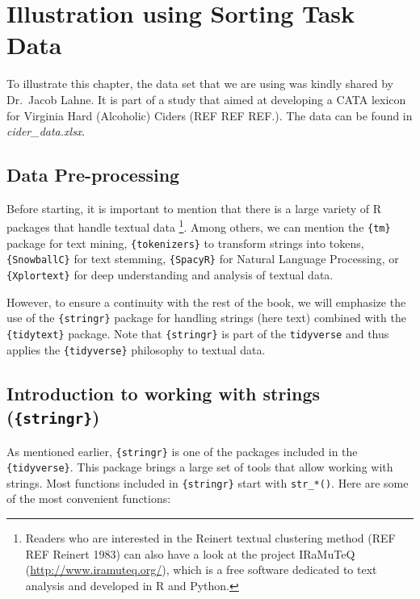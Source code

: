 \documentclass[
]{book}
\begin{document}
\hypertarget{illustration-using-sorting-task-data}{%
\section{Illustration using Sorting Task Data}\label{illustration-using-sorting-task-data}}

To illustrate this chapter, the data set that we are using was kindly shared by Dr.~Jacob Lahne. It is part of a study that aimed at developing a CATA lexicon for Virginia Hard (Alcoholic) Ciders (REF REF REF.). The data can be found in \emph{cider\_data.xlsx}.

\hypertarget{data-pre-processing}{%
\subsection{Data Pre-processing}\label{data-pre-processing}}

Before starting, it is important to mention that there is a large variety of R packages that handle textual data \footnote{Readers who are interested in the Reinert textual clustering method (REF REF Reinert 1983) can also have a look at the project IRaMuTeQ (\url{http://www.iramuteq.org/}), which is a free software dedicated to text analysis and developed in R and Python.}. Among others, we can mention the \texttt{\{tm\}} package for text mining, \texttt{\{tokenizers\}} to transform strings into tokens, \texttt{\{SnowballC\}} for text stemming, \texttt{\{SpacyR\}} for Natural Language Processing, or \texttt{\{Xplortext\}} for deep understanding and analysis of textual data.

However, to ensure a continuity with the rest of the book, we will emphasize the use of the \texttt{\{stringr\}} package for handling strings (here text) combined with the \texttt{\{tidytext\}} package. Note that \texttt{\{stringr\}} is part of the \texttt{tidyverse} and thus applies the \texttt{\{tidyverse\}} philosophy to textual data.

\hypertarget{introduction-to-working-with-strings-stringr}{%
\subsection{\texorpdfstring{Introduction to working with strings (\texttt{\{stringr\}})}{Introduction to working with strings (\{stringr\})}}\label{introduction-to-working-with-strings-stringr}}

As mentioned earlier, \texttt{\{stringr\}} is one of the packages included in the \texttt{\{tidyverse\}}. This package brings a large set of tools that allow working with strings. Most functions included in \texttt{\{stringr\}} start with \texttt{str\_*()}. Here are some of the most convenient functions:
\end{document}

